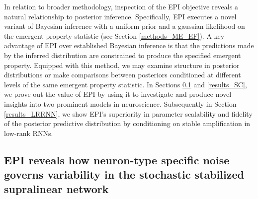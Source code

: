 \documentclass[11pt]{article}
\begin{document}
In relation to broader methodology, inspection of the EPI objective reveals a natural relationship to posterior inference.
Specifically, EPI executes a novel variant of  Bayesian inference with a uniform prior and a gaussian likelihood on the emergent property statistic (see Section \ref{methods_ME_EF}).
A key advantage of EPI over established Bayesian inference is that the predictions made by the inferred distribution are constrained to produce the specified emergent property.
Equipped with this method, we may examine structure in posterior distributions or make comparisons between posteriors conditioned at different levels of the same emergent property statistic.
In Sections \ref{results_V1} and \ref{results_SC}, we prove out the value of EPI by using it to investigate and produce novel insights into two prominent models in neuroscience. 
Subsequently in Section \ref{results_LRRNN}, we show EPI's superiority in parameter scalability and fidelity of the posterior predictive distribution by conditioning on stable amplification in low-rank RNNs.

\subsection{EPI reveals how neuron-type specific noise governs variability in the stochastic stabilized supralinear network} \label{results_V1}
\end{document}
